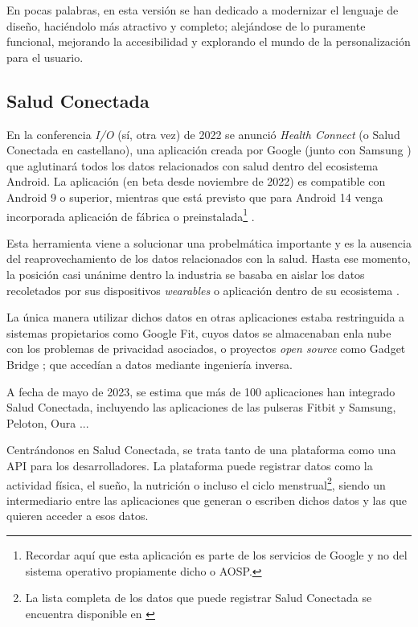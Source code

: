             En pocas palabras, en esta versión se han dedicado a modernizar el lenguaje de diseño, haciéndolo más 
            atractivo y completo; alejándose de lo puramente funcional, mejorando la accesibilidad y explorando 
            el mundo de la personalización para el usuario.

        \subsection{Salud Conectada}
            \label{section:salud_conectada}
            En la conferencia \textit{I/O} (sí, otra vez) de 2022 se anunció \textit{Health Connect} (o Salud Conectada
            en castellano), una aplicación creada por Google (junto con Samsung \cite{wilk_introducing_2022}) 
            que aglutinará todos los datos relacionados con salud dentro del ecosistema
            Android. La aplicación (en beta desde noviembre de 2022) es compatible con Android 9 o 
            superior, mientras que está previsto que para Android 14 venga
            incorporada aplicación de fábrica o preinstalada\footnote{Recordar aquí que esta aplicación es
            parte de los servicios de Google y no del sistema operativo propiamente dicho o AOSP.} 
            \cite{pandey_health_2023}. 

            Esta herramienta viene a solucionar una probelmática importante y es la ausencia del reaprovechamiento de 
            los datos relacionados con la salud. Hasta ese momento, la posición casi unánime dentro la 
            industria se basaba en aislar los datos recoletados por sus dispositivos \textit{\glspl{wearable}} o aplicación 
            dentro de su ecosistema \cite{ramirez_android_2022} \cite{rahman_android_2023}. 
            
            La única manera utilizar dichos datos 
            en otras aplicaciones estaba restringuida a sistemas propietarios como Google Fit, cuyos datos se 
            almacenaban enla nube con los problemas de privacidad asociados, o proyectos \textit{open source} como 
            Gadget Bridge \cite{freeyourgadget_gadgetbridge_nodate}; que accedían a datos mediante ingeniería inversa.
            

            A fecha de mayo de 2023, se estima que más de 100 aplicaciones han integrado Salud Conectada, incluyendo
            las aplicaciones de las pulseras Fitbit y Samsung, Peloton, Oura \cite{malik_googles_2023}... 

            Centrándonos en Salud Conectada, se trata tanto de una plataforma como una API para los desarrolladores.
            La plataforma puede registrar datos como la actividad física, el sueño, la nutrición o incluso el ciclo
            menstrual\footnote{La lista completa de los datos que puede registrar Salud Conectada se encuentra 
            disponible en \cite{noauthor_lista_nodate}}, siendo un intermediario entre las aplicaciones que generan 
            o escriben dichos datos y las que quieren acceder a esos datos. 

